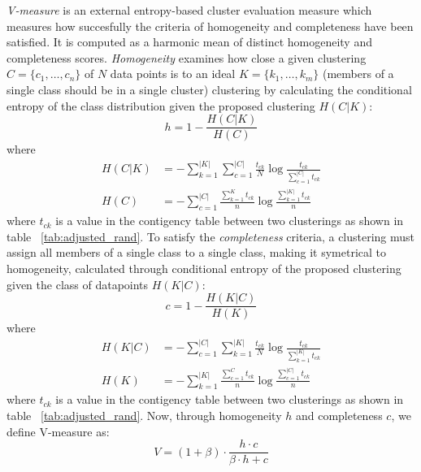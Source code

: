 \textit{V-measure} is an external entropy-based cluster evaluation measure which measures
how succesfully the criteria of homogeneity and completeness have been satisfied. 
\citep{rosenberg2007v}
It is computed as a harmonic mean of distinct homogeneity and completeness scores. 
\textit{Homogeneity} examines how close a given clustering $C = \{c_1, \dots, c_n\}$ of 
$N$ data points
is to an ideal $K = \{k_1, \dots, k_m\}$ (members of a single
class should be in a single cluster) clustering by calculating the 
conditional entropy of the class distribution given the proposed clustering 
$H(C | K)$:
$$
h = 1 - \frac{H(C | K)}{H(C)}
$$
where 
\begin{align*} 
	H(C | K) &= - \sum_{k=1}^{|K|}\sum_{c=1}^{|C|} \frac{t_{ck}}{N}\log \frac{t_{ck}}{\sum_{c=1}^{|C|} t_{ck}} \\
	H(C) &= - \sum_{c=1}^{|C|} \frac{\sum_{k=1}^{K} t_{ck}}{n} \log \frac{\sum_{k=1}^{|K|} t_{ck}}{n}
\end{align*}
where $t_{ck}$ is a value in the contigency table between two clusterings as shown in table~
\ref{tab:adjusted_rand}.
To satisfy the \textit{completeness} criteria, a clustering must assign all 
members of a single class to a single class, making it symetrical to 
homogeneity, calculated through conditional entropy of the proposed clustering
given the class of datapoints $H(K | C)$:
$$
c = 1 - \frac{H(K | C)}{H(K)}
$$
where
\begin{align*}
H(K | C) &= - \sum_{c=1}^{|C|}\sum_{k=1}^{|K|} \frac{t_{ck}}{N} \log \frac{t_{ck}}{\sum_{k=1}^{|K|} t_{ck}} \\
H(K) &= - \sum_{k=1}^{|K|} \frac{\sum_{c=1}^{C} t_{ck}}{n} \log \frac{\sum_{c=1}^{|C|} t_{ck}}{n}
\end{align*}
where $t_{ck}$ is a value in the contigency table between two clusterings as shown in table~
\ref{tab:adjusted_rand}.
Now, through homogeneity $h$ and completeness $c$, we define V-measure as:
\begin{equation}\label{eq:v-measure}
	V = (1 + \beta) \cdot \frac{h \cdot c}{\beta \cdot h + c}
\end{equation}


% 
% 
